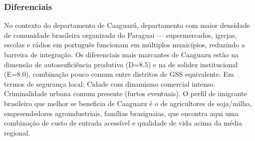 \subsubsection*{Diferenciais}\label{dif-caaguazu-0502}
No contexto do departamento de Caaguazú, departamento com maior densidade de comunidade brasileira organizada do Paraguai — supermercados, igrejas, escolas e rádios em português funcionam em múltiplos municípios, reduzindo a barreira de integração. Os diferenciais mais marcantes de Caaguazu estão na dimensão de autossuficiência produtiva (D=8.5) e na de solidez institucional (E=8.0), combinação pouco comum entre distritos de GSS equivalente. Em termos de segurança local: Cidade com dinamismo comercial intenso. Criminalidade urbana comum presente (furtos eventuais). O perfil de imigrante brasileiro que melhor se beneficia de Caaguazu é o de agricultores de soja/milho, empreendedores agroindustriais, famílias brasiguaias, que encontra aqui uma combinação de custo de entrada acessível e qualidade de vida acima da média regional.
